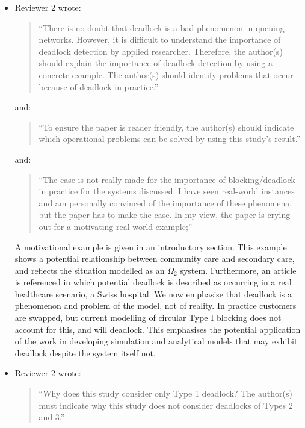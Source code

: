 \documentclass{article}
\begin{document}
\begin{itemize}

\item Reviewer 2 wrote:
\begin{quote}
``There is no doubt that deadlock is a bad phenomenon in queuing networks.
However, it is difficult to understand the importance of deadlock detection by
applied researcher.
Therefore, the author(s) should explain the importance of deadlock detection
by using a concrete example.
The author(s) should identify problems that occur because of deadlock in
practice.''
\end{quote}

and:

\begin{quote}
``To ensure the paper is reader friendly, the author(s) should indicate which
operational problems can be solved by using this study’s result.''
\end{quote}

and:

\begin{quote}
``The case is not really made for the importance of blocking/deadlock in
practice for the systems discussed.
I have seen real-world instances and am personally convinced of the importance
of these phenomena, but the paper has to make the case.
In my view, the paper is crying out for a motivating real-world example;''
\end{quote}

A motivational example is given in an introductory section.
This example shows a potential relationship between community care and
secondary care, and reflects the situation modelled as an $\Omega_2$ system.
Furthermore, an article is referenced in which potential deadlock is described
as occurring in a real healthcare scenario, a Swiss hospital.
We now emphasise that deadlock is a phenomenon and problem of the model, not
of reality.
In practice customers are swapped, but current modelling of circular Type I
blocking does not account for this, and will deadlock.
This emphasises the potential application of the work in developing simulation
and analytical models that may exhibit deadlock despite the system itself not.


\item Reviewer 2 wrote:
\begin{quote}
``Why does this study consider only Type 1 deadlock?
The author(s) must indicate why this study does not consider deadlocks of
Types 2 and 3.''
\end{quote}


\end{itemize}
\end{document}
